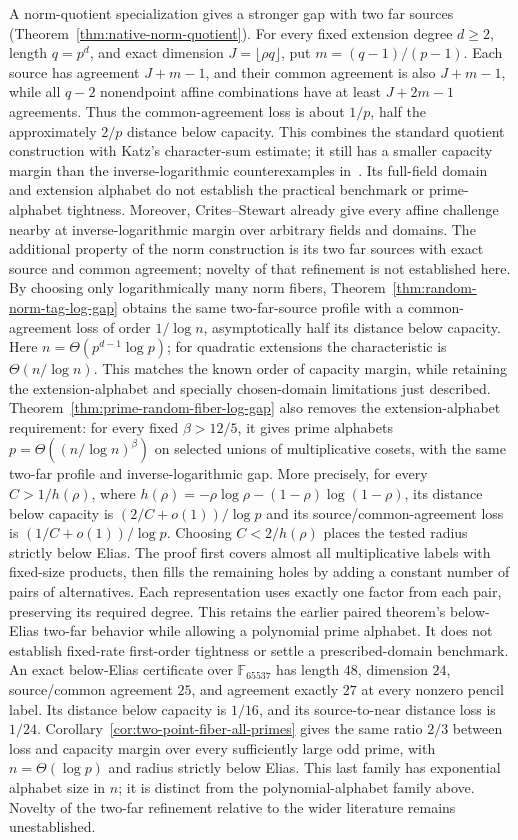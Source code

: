 \documentclass[11pt,letterpaper]{article}
\theoremstyle{definition}
\theoremstyle{remark}
\begin{document}
A norm-quotient specialization gives a stronger gap with two far sources
(Theorem~\ref{thm:native-norm-quotient}). For every fixed extension degree
$d\ge2$, length $q=p^d$, and exact dimension $J=\lfloor\rho q\rfloor$,
put $m=(q-1)/(p-1)$. Each source has agreement $J+m-1$, and their common
agreement is also $J+m-1$, while all $q-2$ nonendpoint affine combinations have at least
$J+2m-1$ agreements. Thus the common-agreement loss is about $1/p$,
half the approximately $2/p$ distance below capacity. This combines the
standard quotient construction with Katz's character-sum estimate;
it still has a smaller capacity margin than the inverse-logarithmic
counterexamples in~\cite{kkh}. Its full-field domain and extension
alphabet do not establish the practical benchmark or prime-alphabet
tightness.
Moreover, Crites--Stewart already give every affine challenge nearby
at inverse-logarithmic margin over arbitrary fields and domains.
The additional property of the norm construction is its two far
sources with exact source and common agreement; novelty of that
refinement is not established here.
By choosing only logarithmically many norm fibers,
Theorem~\ref{thm:random-norm-tag-log-gap} obtains the same two-far-source
profile with a common-agreement loss of order $1/\log n$, asymptotically
half its distance below capacity. Here
$n=\Theta(p^{d-1}\log p)$; for quadratic extensions the characteristic
is $\Theta(n/\log n)$. This matches the known order of capacity margin,
while retaining the extension-alphabet and specially chosen-domain
limitations just described.
Theorem~\ref{thm:prime-random-fiber-log-gap} also removes the
extension-alphabet requirement: for every fixed $\beta>12/5$, it gives
prime alphabets $p=\Theta((n/\log n)^\beta)$ on selected unions of
multiplicative cosets, with the same two-far profile and inverse-logarithmic
gap. More precisely, for every $C>1/h(\rho)$, where
$h(\rho)=-\rho\log\rho-(1-\rho)\log(1-\rho)$, its distance below
capacity is $(2/C+o(1))/\log p$ and its source/common-agreement loss is
$(1/C+o(1))/\log p$. Choosing $C<2/h(\rho)$ places the tested radius
strictly below Elias. The proof first covers almost all multiplicative
labels with fixed-size products, then fills the remaining holes by
adding a constant number of pairs of alternatives. Each representation
uses exactly one factor from each pair, preserving its required degree.
This retains the earlier paired theorem's below-Elias two-far behavior
while allowing a polynomial prime alphabet. It does not establish
fixed-rate first-order tightness or settle a prescribed-domain benchmark.
An exact below-Elias certificate over $\mathbb F_{65537}$ has length
$48$, dimension $24$, source/common agreement $25$, and agreement
exactly $27$ at every nonzero pencil label. Its distance below capacity
is $1/16$, and its source-to-near distance loss is $1/24$.
Corollary~\ref{cor:two-point-fiber-all-primes} gives the same ratio
$2/3$ between loss and capacity margin over every sufficiently large
odd prime, with $n=\Theta(\log p)$ and radius strictly below Elias.
This last family has exponential alphabet size in $n$; it is distinct
from the polynomial-alphabet family above.
Novelty of the two-far refinement relative to the wider literature
remains unestablished.
\end{document}
